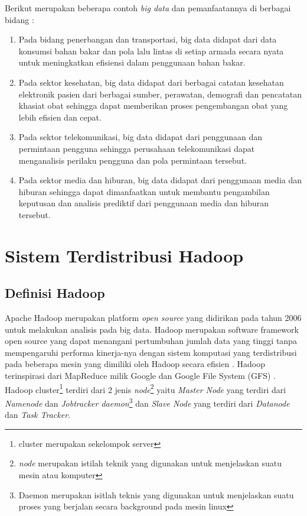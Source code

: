Berikut merupakan beberapa contoh \textit{big data} dan pemanfaatannya di berbagai bidang \cite{JNetwork2012introductionBigData}:
\begin{enumerate}
	\item Pada bidang penerbangan dan transportasi, big data didapat dari data konsumsi bahan bakar dan pola lalu lintas di setiap armada secara nyata untuk meningkatkan efisiensi dalam penggunaan bahan bakar.
	\item Pada sektor kesehatan, big data didapat dari berbagai catatan kesehatan elektronik pasien dari berbagai sumber, perawatan, demografi dan pencatatan khasiat obat sehingga dapat memberikan proses pengembangan obat yang lebih efisien dan cepat.
	\item Pada sektor telekomunikasi, big data didapat dari penggunaan dan permintaan pengguna sehingga perusahaan telekomunikasi dapat menganalisis perilaku pengguna dan pola permintaan tersebut.
	\item Pada sektor media dan hiburan, big data didapat dari penggunaan media dan hiburan sehingga dapat dimanfaatkan untuk membantu pengambilan keputusan dan analisis prediktif dari penggunaan media dan hiburan tersebut.
\end{enumerate}


\section{Sistem Terdistribusi Hadoop}
	\subsection{Definisi Hadoop}
	Apache Hadoop merupakan platform \textit{open source} yang didirikan pada tahun 2006 untuk melakukan analisis pada big data. Hadoop merupakan software framework open source yang dapat menangani pertumbuhan jumlah data yang tinggi tanpa mempengaruhi performa kinerja-nya dengan sistem komputasi yang terdistribusi pada beberapa mesin yang dimiliki oleh Hadoop secara efisien \cite{Lam:2010:HA:1965594}. Hadoop terinspirasi dari MapReduce milik Google\cite{GoogleMR:2004} dan Google File System (GFS) \cite{GFS:2003}. \\
	Hadoop cluster\footnote{cluster merupakan sekelompok server} terdiri dari 2 jenis \textit{node}\footnote{\textit{node} merupakan istilah teknik yang digunakan untuk menjelaskan suatu mesin atau komputer} yaitu \textit{Master Node} yang terdiri dari \textit{Namenode} dan \textit{Jobtracker daemon}\footnote{Daemon merupakan isitlah teknis yang digunakan untuk menjelaskan suatu proses yang berjalan secara background pada mesin linux} dan \textit{Slave Node} yang terdiri dari \textit{Datanode} dan \textit{Task Tracker}.
	
